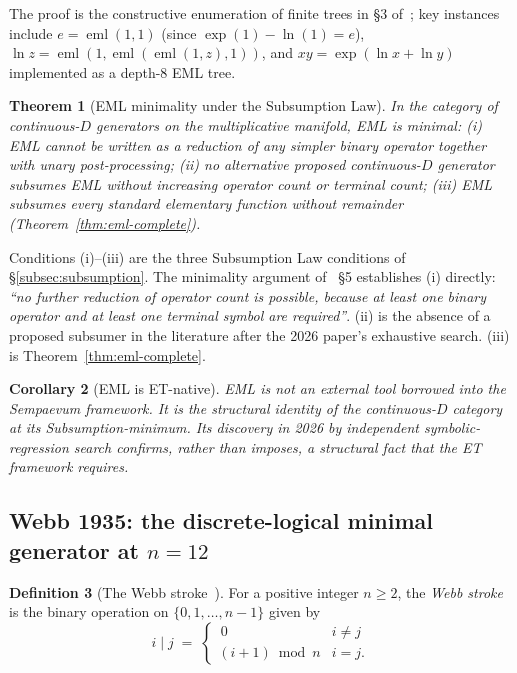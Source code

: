 \documentclass[11pt,a4paper]{article}
\newtheorem{theorem}{Theorem}[section]
\newtheorem{corollary}[theorem]{Corollary}
\theoremstyle{definition}
\newtheorem{definition}[theorem]{Definition}
\theoremstyle{remark}
\begin{document}
The proof is the constructive enumeration of finite trees in \S3 of~\cite{Odrzywolek2026}; key instances include $e = \operatorname{eml}(1,1)$ (since $\exp(1)-\ln(1)=e$), $\ln z = \operatorname{eml}(1,\operatorname{eml}(\operatorname{eml}(1,z),1))$, and $xy = \exp(\ln x + \ln y)$ implemented as a depth-$8$ EML tree.

\begin{theorem}[EML minimality under the Subsumption Law]\label{thm:eml-minimal}
In the category of continuous-$D$ generators on the multiplicative manifold, EML is minimal: (i) EML cannot be written as a reduction of any simpler binary operator together with unary post-processing; (ii) no alternative proposed continuous-$D$ generator subsumes EML without increasing operator count or terminal count; (iii) EML subsumes every standard elementary function without remainder (Theorem~\ref{thm:eml-complete}).
\end{theorem}

Conditions (i)--(iii) are the three Subsumption Law conditions of \S\ref{subsec:subsumption}. The minimality argument of~\cite{Odrzywolek2026} \S5 establishes (i) directly: \emph{``no further reduction of operator count is possible, because at least one binary operator and at least one terminal symbol are required''}. (ii) is the absence of a proposed subsumer in the literature after the 2026 paper's exhaustive search. (iii) is Theorem~\ref{thm:eml-complete}.

\begin{corollary}[EML is ET-native]
EML is not an external tool borrowed into the Sempaevum framework. It is the structural identity of the continuous-$D$ category at its Subsumption-minimum. Its discovery in 2026 by independent symbolic-regression search confirms, rather than imposes, a structural fact that the ET framework requires.
\end{corollary}

\subsection{Webb 1935: the discrete-logical minimal generator at $n=12$}\label{subsec:webb}

\begin{definition}[The Webb stroke~\cite{Webb1935}]\label{def:webb}
For a positive integer $n\ge 2$, the \emph{Webb stroke} is the binary operation on $\{0,1,\ldots,n-1\}$ given by
\[
i \mathbin{|} j \;=\; \begin{cases}\, 0 & i \neq j \\ (i+1) \bmod n & i = j.\end{cases}
\]
\end{definition}
\end{document}
